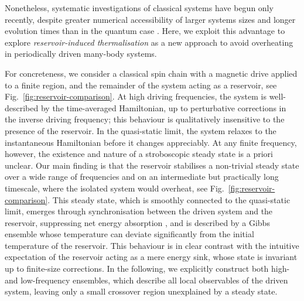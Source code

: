 \documentclass[prl,aps,twocolumn,notitlepage,10pt]{revtex4-1}
\begin{document}
Nonetheless, systematic investigations of classical systems have begun only
recently, despite greater numerical accessibility of larger systems sizes and
longer evolution times than in the quantum case
\cite{Nunnenkamp,Howell,Mori-Floquet-prethermal,Citro-Dalla-Torre,Bukov-DAlessio-Polkovnikov-review,McRoberts-Bilitewski-Haque-Moessner}.
Here, we exploit this advantage to explore \emph{reservoir-induced
  thermalisation} as a new approach to avoid overheating in periodically driven
many-body systems.

For concreteness, we consider a classical spin chain with a magnetic drive
applied to a finite region, and the remainder of the system acting as a
reservoir, see Fig.~\ref{fig:reservoir-comparison}.
At high driving frequencies, the system is well-described by the time-averaged
Hamiltonian, up to perturbative corrections in the inverse driving frequency; 
this behaviour is qualitatively insensitive to the presence of the reservoir.
In the quasi-static limit, the system relaxes to the instantaneous Hamiltonian
before it changes appreciably.
At any finite frequency, however, the existence and nature of a stroboscopic
steady state is a priori unclear.
Our main finding is that the reservoir stabilises a non-trivial steady state
over a wide range of frequencies and on an intermediate but practically long
timescale, where the isolated system would overheat, see
Fig.~\ref{fig:reservoir-comparison}.
This steady state, which is smoothly connected to the quasi-static limit,
emerges through synchronisation between the driven system and the reservoir,
suppressing net energy absorption \cite{long-paper}, and is described by a
Gibbs ensemble whose temperature can deviate significantly from the initial
temperature of the reservoir.
This behaviour is in clear contrast with the intuitive expectation of the
reservoir acting as a mere energy sink, whose state is invariant up to
finite-size corrections.
In the following, we explicitly construct both high- and low-frequency
ensembles, which describe all local observables of the driven system, leaving
only a small crossover region unexplained by a steady state.
\end{document}
